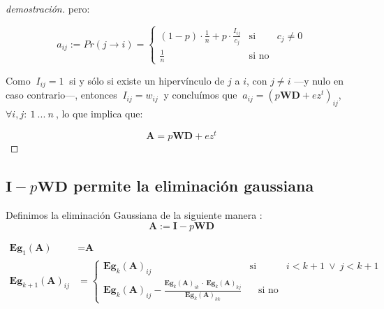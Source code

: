 \begin{proof}[demostración]
\noindent pero: 
\vspace{1em}

\begin{equation*}
    a_{ij} := Pr(j \longrightarrow i) = \left\{ 
                                            \begin{array}{lcc}
                                            (1 - p)\cdot \frac{1}{n} + p \cdot \frac{I_{ij}}{c_j}      &  \text{si}    & c_j \neq 0\\
                                            \frac{1}{n}                                                &  \text{si no}  &
                                            \end{array}
                                        \right.
\end{equation*}
\vspace{1em}

\noindent Como $\ I_{ij} = 1\ $ si y sólo si existe un hipervínculo de $j$ a $i$, con $j \neq i$ ---y nulo en caso contrario---, entonces $\ I_{ij} = w_{ij}\ $ y concluímos que $\ a_{ij} = (p\textbf{W}\textbf{D} + ez^t)_{ij}$, $\forall i, j:\ 1\ ...\ n\ $,  lo que implica que:
\vspace{1em}

\begin{equation*}
    \textbf{A} = p\textbf{W}\textbf{D} + ez^t
\end{equation*}
\vspace{1em}

\end{proof}


\subsection{$\textbf{I} - p\textbf{W}\textbf{D}$ permite la eliminación gaussiana}\label{A.2}


Definimos la eliminación Gaussiana de la siguiente manera : \\

\begin{equation*}
\textbf{A} := \textbf{I} - p\textbf{WD}
\end{equation*}

\begin{align*}
    \textbf{Eg}_{1}(\textbf{A}) \ \ \  &=   \textbf{A}
                            \\
    \textbf{Eg}_{k+1}(\textbf{A})_{ij}  &=  \left\{ 
                                    \begin{array}{lcc}
                                    \textbf{Eg}_{k}(\textbf{A})_{ij}  &   \text{si}    & i < k+1 \ \vee \  j < k+1 \\
                                    \textbf{Eg}_{k}(\textbf{A})_{ij} - \frac {\textbf{Eg}_{k}(\textbf{A})_{ik} \ \cdot \ \textbf{Eg}_{k}(\textbf{A})_{kj}}{\textbf{Eg}_{k}(\textbf{A})_{kk}}    &  \ \ \ \  \text{si no} &
                                    \end{array}
                                \right.\
\end{align*}



